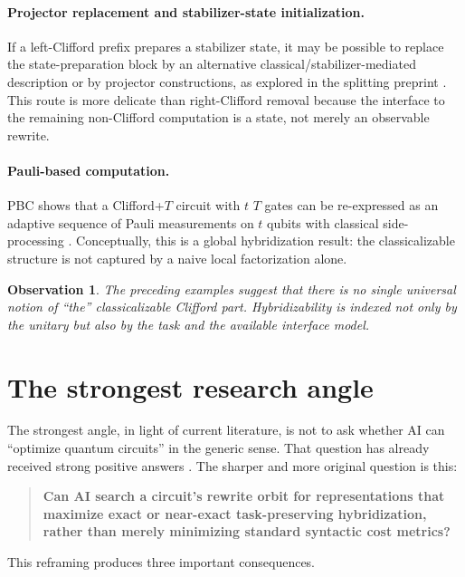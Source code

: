 \documentclass[11pt]{article}
\newtheorem{observation}{Observation}
\theoremstyle{remark}
\begin{document}
\paragraph{Projector replacement and stabilizer-state initialization.}
If a left-Clifford prefix prepares a stabilizer state, it may be possible to replace the state-preparation block by an alternative classical/stabilizer-mediated description or by projector constructions, as explored in the splitting preprint \cite{splitting_2025}. This route is more delicate than right-Clifford removal because the interface to the remaining non-Clifford computation is a state, not merely an observable rewrite.

\paragraph{Pauli-based computation.}
PBC shows that a Clifford+$T$ circuit with $t$ $T$ gates can be re-expressed as an adaptive sequence of Pauli measurements on $t$ qubits with classical side-processing \cite{peres_galvao_2023}. Conceptually, this is a global hybridization result: the classicalizable structure is not captured by a naive local factorization alone.

\begin{observation}
The preceding examples suggest that there is no single universal notion of ``the'' classicalizable Clifford part. Hybridizability is indexed not only by the unitary but also by the task and the available interface model.
\end{observation}

\section{The strongest research angle}

The strongest angle, in light of current literature, is not to ask whether AI can ``optimize quantum circuits'' in the generic sense. That question has already received strong positive answers \cite{rlzx_2025, alphatensor_2025}. The sharper and more original question is this:

\begin{quote}
\textbf{Can AI search a circuit's rewrite orbit for representations that maximize exact or near-exact task-preserving hybridization, rather than merely minimizing standard syntactic cost metrics?}
\end{quote}

This reframing produces three important consequences.
\end{document}
